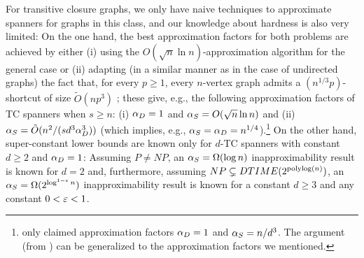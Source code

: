 For transitive closure graphs, we only have naive techniques to approximate spanners for graphs in this class, and our knowledge about hardness is also very limited: On the one hand, the best approximation factors for both problems are achieved by either (i) using the $O(\sqrt{n}\ln n)$-approximation algorithm for the general case \cite{BermanBMRY11}
or (ii) adapting (in a similar manner as in the case of undirected graphs) the fact that, for every $p\geq 1$, every $n$-vertex graph admits a $(n^{1/3}p)$-shortcut of size $\tilde O(np^3)$ \cite{KoganP22};
these give, e.g., the following approximation factors of TC spanners when $s\geq n$: (i) $\alpha_D=1$ and $\alpha_S=O(\sqrt{n}\ln n)$ and (ii) $\alpha_S=\tilde O(n^2/(sd^3\alpha_D^3))$ (which implies, e.g., $\alpha_S=\alpha_D=n^{1/4}$).\footnote{\cite{KoganP22} only claimed approximation factors $\alpha_D=1$ and $\alpha_S=n/d^3$. The argument (from \cite{AhoGU72}) can be generalized to the approximation factors we mentioned.} 
On the other hand, super-constant lower bounds are known only for $d$-TC spanners with constant $d \geq 2$ and $\alpha_D=1$: Assuming $P \neq NP$, an $\alpha_S = \Omega(\log n)$ inapproximability result is known for $d = 2$ and, furthermore, assuming $NP\subsetneq DTIME(2^{\mathrm{polylog}(n)})$, an $\alpha_S= \Omega(2^{\log^{1-\varepsilon}n})$ inapproximability result is known for a constant $d \geq 3$ and any constant $0<\varepsilon < 1$.
































\endinput
























































